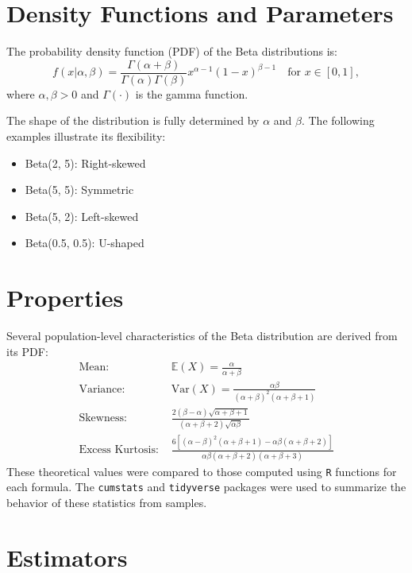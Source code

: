 \documentclass{article}\usepackage[]{graphicx}\usepackage[]{xcolor}
\begin{document}
\begin{multicols}{2}
\section{Density Functions and Parameters}

The probability density function (PDF) of the Beta distributions is:
\begin{equation*}
f(x|\alpha, \beta) = \frac{\Gamma(\alpha + \beta)}{\Gamma(\alpha)\Gamma(\beta)} x^{\alpha - 1}(1 - x)^{\beta - 1} \quad \text{for } x \in [0, 1],
\end{equation*}
where $\alpha, \beta > 0$ and $\Gamma(\cdot)$ is the gamma function.

The shape of the distribution is fully determined by $\alpha$ and $\beta$. The following examples illustrate its flexibility: 
\begin{itemize}
\item Beta(2, 5): Right-skewed
\item Beta(5, 5): Symmetric
\item Beta(5, 2): Left-skewed
\item Beta(0.5, 0.5): U-shaped
\end{itemize}


\section{Properties}

Several population-level characteristics of the Beta distribution are derived from its PDF:
\begin{align*}
\text{Mean: } & \mathbb{E}(X) = \frac{\alpha}{\alpha + \beta} \\
\text{Variance: } & \text{Var}(X) = \frac{\alpha \beta}{(\alpha + \beta)^2 (\alpha + \beta + 1)} \\
\text{Skewness: } & \frac{2(\beta - \alpha) \sqrt{\alpha + \beta + 1}}{(\alpha + \beta + 2) \sqrt{\alpha \beta}} \\
\text{Excess Kurtosis: } & \frac{6[(\alpha - \beta)^2 (\alpha + \beta + 1) - \alpha \beta (\alpha + \beta + 2)]}{\alpha \beta (\alpha + \beta + 2)(\alpha + \beta + 3)}
\end{align*}
These theoretical values were compared to those computed using \texttt{R} functions for each formula. The \texttt{cumstats} and \texttt{tidyverse} packages were used to summarize the behavior of these statistics from samples.

\section{Estimators}


\end{multicols}
\end{document}

